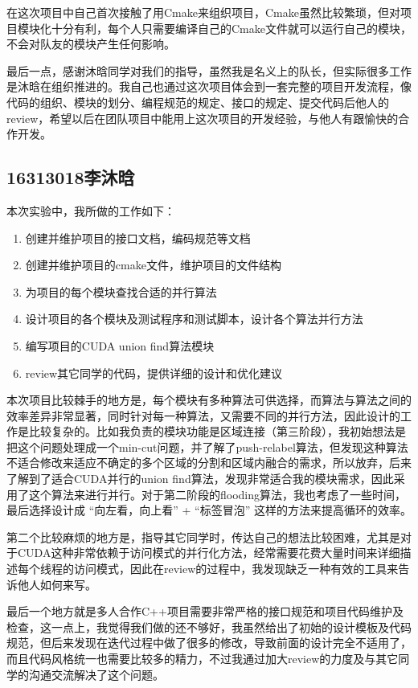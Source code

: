 \documentclass[a4paper, 11pt]{article}
\begin{document}
在这次项目中自己首次接触了用Cmake来组织项目，Cmake虽然比较繁琐，但对项目模块化十分有利，每个人只需要编译自己的Cmake文件就可以运行自己的模块，不会对队友的模块产生任何影响。

最后一点，感谢沐晗同学对我们的指导，虽然我是名义上的队长，但实际很多工作是沐晗在组织推进的。我自己也通过这次项目体会到一套完整的项目开发流程，像代码的组织、模块的划分、编程规范的规定、接口的规定、提交代码后他人的review，希望以后在团队项目中能用上这次项目的开发经验，与他人有跟愉快的合作开发。
\subsection{16313018李沐晗}
本次实验中，我所做的工作如下：
\begin{enumerate}
    \item 创建并维护项目的接口文档，编码规范等文档
    \item 创建并维护项目的cmake文件，维护项目的文件结构
    \item 为项目的每个模块查找合适的并行算法
    \item 设计项目的各个模块及测试程序和测试脚本，设计各个算法并行方法
    \item 编写项目的CUDA union find算法模块
    \item review其它同学的代码，提供详细的设计和优化建议
\end{enumerate}
本次项目比较棘手的地方是，每个模块有多种算法可供选择，而算法与算法之间的效率差异非常显著，同时针对每一种算法，又需要不同的并行方法，因此设计的工作是比较复杂的。比如我负责的模块功能是区域连接（第三阶段），我初始想法是把这个问题处理成一个min-cut问题，并了解了push-relabel算法，但发现这种算法不适合修改来适应不确定的多个区域的分割和区域内融合的需求，所以放弃，后来了解到了适合CUDA并行的union find算法，发现非常适合我的模块需求，因此采用了这个算法来进行并行。对于第二阶段的flooding算法，我也考虑了一些时间，最后选择设计成 “向左看，向上看” + “标签冒泡” 这样的方法来提高循环的效率。

第二个比较麻烦的地方是，指导其它同学时，传达自己的想法比较困难，尤其是对于CUDA这种非常依赖于访问模式的并行化方法，经常需要花费大量时间来详细描述每个线程的访问模式，因此在review的过程中，我发现缺乏一种有效的工具来告诉他人如何来写。

最后一个地方就是多人合作C++项目需要非常严格的接口规范和项目代码维护及检查，这一点上，我觉得我们做的还不够好，我虽然给出了初始的设计模板及代码规范，但后来发现在迭代过程中做了很多的修改，导致前面的设计完全不适用了，而且代码风格统一也需要比较多的精力，不过我通过加大review的力度及与其它同学的沟通交流解决了这个问题。
\end{document}
